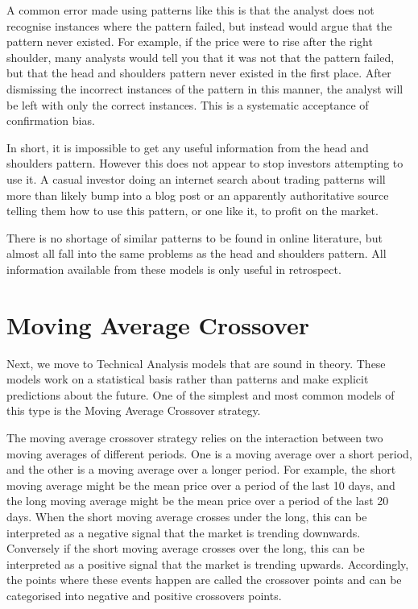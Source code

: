 \documentclass{report}
\begin{document}
A common error made using patterns like this is that the analyst does not recognise instances where the pattern failed, but instead would argue that the pattern never existed. For example, if the price were to rise after the right shoulder, many analysts would tell you that it was not that the pattern failed, but that the head and shoulders pattern never existed in the first place. After dismissing the incorrect instances of the pattern in this manner, the analyst will be left with only the correct instances. This is a systematic acceptance of confirmation bias.

In short, it is impossible to get any useful information from the head and shoulders pattern. However this does not appear to stop investors attempting to use it. A casual investor doing an internet search about trading patterns will more than likely bump into a blog post or an apparently authoritative source telling them how to use this pattern, or one like it, to profit on the market. 

There is no shortage of similar patterns to be found in online literature, but almost all fall into the same problems as the head and shoulders pattern. All information available from these models is only useful in retrospect. 

\section{Moving Average Crossover}

Next, we move to Technical Analysis models that are sound in theory. These models work on a statistical basis rather than patterns and make explicit predictions about the future. One of the simplest and most common models of this type is the Moving Average Crossover strategy.

The moving average crossover strategy relies on the interaction between two moving averages of different periods. One is a moving average over a short period, and the other is a moving average over a longer period. For example, the short moving average might be the mean price over a period of the last 10 days, and the long moving average might be the mean price over a period of the last 20 days. When the short moving average crosses under the long, this can be interpreted as a negative signal that the market is trending downwards. Conversely if the short moving average crosses over the long, this can be interpreted as a positive signal that the market is trending upwards. Accordingly, the points where these events happen are called the crossover points and can be categorised into negative and positive crossovers points.
\end{document}

